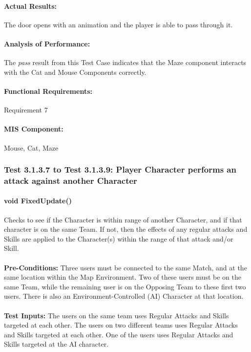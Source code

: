\documentclass{article}
\begin{document}
    \paragraph{Actual Results:} The door opens with an animation and the player is able to pass through it.
    \paragraph{Analysis of Performance:} The \emph{pass} result from this Test Case indicates that the Maze component interacts with the Cat and Mouse Components correctly.
    \paragraph{Functional Requirements:} Requirement 7
    \paragraph{MIS Component:} Mouse, Cat, Maze
    
     \subsubsection{Test 3.1.3.7 to Test 3.1.3.9: Player Character performs an attack against another Character}
    \paragraph{}\textbf{void FixedUpdate()}
    \paragraph{} Checks to see if the Character is within range of another Character, and if that character is on the same Team. If not, then the effects of any regular attacks and Skills are applied to the Character(s) within the range of that attack and/or Skill.
    \paragraph{}\textbf{Pre-Conditions:} Three users must be connected to the same Match, and at the same location within the Map Environment. Two of these users must be on the same Team, while the remaining user is on the Opposing Team to these first two users. There is also an Environment-Controlled (AI) Character at that location.
    \paragraph{}\textbf{Test Inputs:} The users on the same team uses Regular Attacks and Skills targeted at each other. The users on two different teams uses Regular Attacks and Skills targeted at each other. One of the users  uses Regular Attacks and Skills targeted at the AI character.
\end{document}
